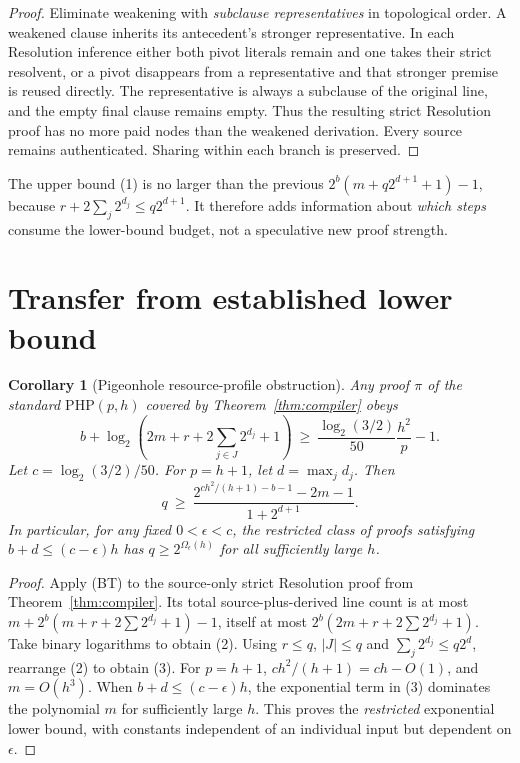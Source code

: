 \documentclass[11pt]{article}
\newtheorem{corollary}[theorem]{Corollary}
\begin{document}
\begin{proof}
Eliminate weakening with \emph{subclause representatives} in topological order. A weakened clause inherits its antecedent's stronger representative. In each Resolution inference either both pivot literals remain and one takes their strict resolvent, or a pivot disappears from a representative and that stronger premise is reused directly. The representative is always a subclause of the original line, and the empty final clause remains empty. Thus the resulting strict Resolution proof has no more paid nodes than the weakened derivation. Every source remains authenticated. Sharing within each branch is preserved.
\end{proof}

The upper bound (1) is no larger than the previous $2^b(m+q2^{d+1}+1)-1$, because $r+2\sum_j 2^{d_j}\le q2^{d+1}$. It therefore adds information about \emph{which steps} consume the lower-bound budget, not a speculative new proof strength.

\section*{Transfer from established lower bound}
\begin{corollary}[Pigeonhole resource-profile obstruction]
Any proof $\pi$ of the standard $\mathrm{PHP}(p,h)$ covered by Theorem~\ref{thm:compiler} obeys
\[
\boxed{
b+\log_2\!\left(2m+r+2\sum_{j\in J}2^{d_j}+1\right)
\ \ge\
\frac{\log_2(3/2)}{50}\frac{h^2}{p}-1 .
}
\tag{2}
\]
Let $c=\log_2(3/2)/50$. For $p=h+1$, let $d=\max_jd_j$. Then
\[
\boxed{
q\ \ge\
\frac{2^{c h^2/(h+1)-b-1}-2m-1}
{1+2^{d+1}} .
}
\tag{3}
\]
In particular, for any fixed $0<\epsilon<c$, the \emph{restricted class} of proofs satisfying $b+d\le(c-\epsilon)h$ has $q\ge 2^{\Omega_\epsilon(h)}$ for all sufficiently large $h$.
\end{corollary}
\begin{proof}
Apply (BT) to the source-only strict Resolution proof from Theorem~\ref{thm:compiler}. Its total source-plus-derived line count is at most $m+2^b(m+r+2\sum 2^{d_j}+1)-1$, itself at most $2^b(2m+r+2\sum2^{d_j}+1)$. Take binary logarithms to obtain (2). Using $r\le q$, $|J|\le q$ and $\sum_j2^{d_j}\le q2^d$, rearrange (2) to obtain (3). For $p=h+1$, $c h^2/(h+1)=ch-O(1)$, and $m=O(h^3)$. When $b+d\le(c-\epsilon)h$, the exponential term in (3) dominates the polynomial $m$ for sufficiently large $h$. This proves the \emph{restricted} exponential lower bound, with constants independent of an individual input but dependent on $\epsilon$.
\end{proof}
\end{document}
